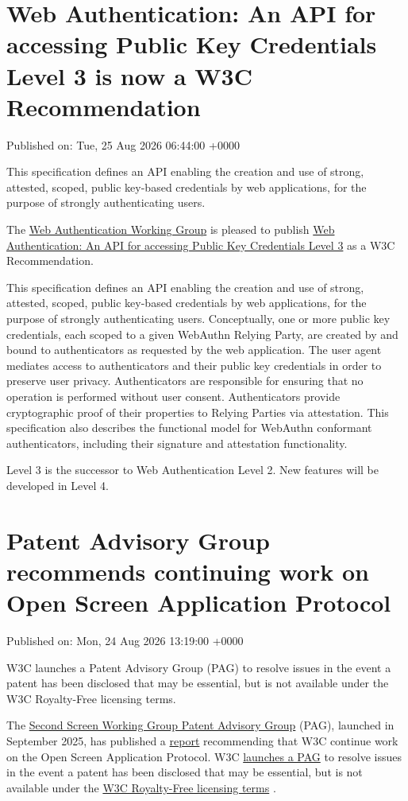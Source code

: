 \documentclass[11pt,a4paper]{article}
\begin{document}
\section{Web Authentication: An API for accessing Public Key Credentials Level 3 is now a W3C Recommendation}

Published on: Tue, 25 Aug 2026 06:44:00 +0000

This specification defines an API enabling the creation and use of strong, attested, scoped, public key-based credentials by web applications, for the purpose of strongly authenticating users.

The \href{https://www.w3.org/groups/wg/webauthn/}{Web Authentication Working Group} is pleased to publish \href{https://www.w3.org/TR/2026/REC-webauthn-3-20260825/}{Web Authentication: An API for accessing Public Key Credentials Level 3} as a W3C Recommendation.

This specification defines an API enabling the creation and use of strong, attested, scoped, public key-based credentials by web applications, for the purpose of strongly authenticating users. Conceptually, one or more public key credentials, each scoped to a given WebAuthn Relying Party, are created by and bound to authenticators as requested by the web application. The user agent mediates access to authenticators and their public key credentials in order to preserve user privacy. Authenticators are responsible for ensuring that no operation is performed without user consent. Authenticators provide cryptographic proof of their properties to Relying Parties via attestation. This specification also describes the functional model for WebAuthn conformant authenticators, including their signature and attestation functionality.

Level 3 is the successor to Web Authentication Level 2. New features will be developed in Level 4.

\section{Patent Advisory Group recommends continuing work on Open Screen Application Protocol}

Published on: Mon, 24 Aug 2026 13:19:00 +0000

W3C launches a Patent Advisory Group (PAG) to resolve issues in the event a patent has been disclosed that may be essential, but is not available under the W3C Royalty-Free licensing terms.

The \href{https://www.w3.org/2025/06/secondscreen-pag/}{Second Screen Working Group Patent Advisory Group} (PAG), launched in September 2025, has published a \href{https://www.w3.org/2025/06/secondscreen-pag/report.html}{report} recommending that W3C continue work on the Open Screen Application Protocol. W3C \href{https://www.w3.org/policies/patent-policy/\#sec-Exception}{launches a PAG} to resolve issues in the event a patent has been disclosed that may be essential, but is not available under the \href{https://www.w3.org/policies/patent-policy/\#sec-Requirements}{W3C Royalty-Free licensing terms} .
\end{document}
